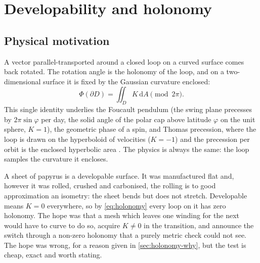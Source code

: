 \section{Developability and holonomy}
\label{sec:holonomy}

\subsection{Physical motivation}
A vector parallel-transported around a closed loop on a curved surface comes back rotated. The rotation angle is the holonomy of the loop, and on a two-dimensional surface it is fixed by the Gaussian curvature enclosed:
\begin{equation}
\Phi(\partial D) = \iint_D K\,\mathrm{d}A \pmod{2\pi}.
\label{eq:holonomy}
\end{equation}
This single identity underlies the Foucault pendulum (the swing plane precesses by $2\pi\sin\varphi$ per day, the solid angle of the polar cap above latitude $\varphi$ on the unit sphere, $K=1$), the geometric phase of a spin, and Thomas precession, where the loop is drawn on the hyperboloid of velocities ($K=-1$) and the precession per orbit is the enclosed hyperbolic area \cite{rhodes2004}. The physics is always the same: the loop samples the curvature it encloses.

A sheet of papyrus is a developable surface. It was manufactured flat and, however it was rolled, crushed and carbonised, the rolling is to good approximation an isometry: the sheet bends but does not stretch. Developable means $K=0$ everywhere, so by \cref{eq:holonomy} every loop on it has zero holonomy. The hope was that a mesh which leaves one winding for the next would have to curve to do so, acquire $K\neq0$ in the transition, and announce the switch through a non-zero holonomy that a purely metric check could not see. The hope was wrong, for a reason given in \cref{sec:holonomy-why}, but the test is cheap, exact and worth stating.

